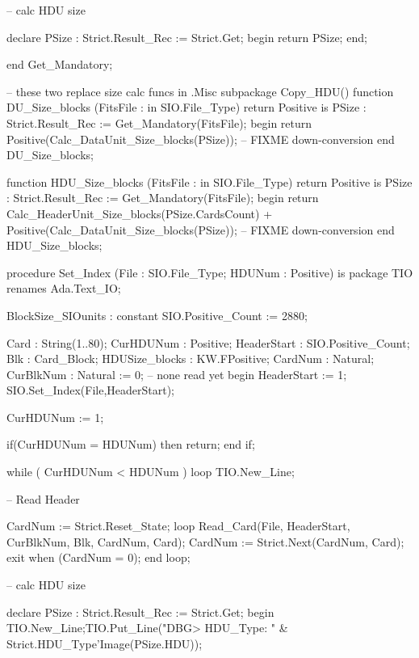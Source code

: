                 -- calc HDU size

                declare
                        PSize : Strict.Result_Rec := Strict.Get;
                begin
			return PSize;
                end;

   end Get_Mandatory;


	
-- these two replace size calc funcs in .Misc subpackage Copy_HDU()
   function  DU_Size_blocks (FitsFile : in SIO.File_Type) return Positive
   is 
	PSize : Strict.Result_Rec := Get_Mandatory(FitsFile);
   begin
        return Positive(Calc_DataUnit_Size_blocks(PSize)); -- FIXME down-conversion
   end DU_Size_blocks;

  function  HDU_Size_blocks (FitsFile : in SIO.File_Type) return Positive
   is 
	PSize : Strict.Result_Rec := Get_Mandatory(FitsFile);
   begin
        return Calc_HeaderUnit_Size_blocks(PSize.CardsCount)
               + Positive(Calc_DataUnit_Size_blocks(PSize)); -- FIXME down-conversion
   end HDU_Size_blocks;




procedure Set_Index
           (File   : SIO.File_Type;
            HDUNum : Positive)
is
        package TIO renames Ada.Text_IO;

        BlockSize_SIOunits : constant SIO.Positive_Count := 2880;
    
        Card : String(1..80);
        CurHDUNum : Positive;
        HeaderStart : SIO.Positive_Count;
        Blk : Card_Block;
        HDUSize_blocks : KW.FPositive;
        CardNum : Natural;
        CurBlkNum : Natural := 0; -- none read yet
begin
        HeaderStart := 1;
        SIO.Set_Index(File,HeaderStart);

        CurHDUNum := 1;

        if(CurHDUNum = HDUNum) then
                return;
        end if;

        while ( CurHDUNum < HDUNum )
        loop
                TIO.New_Line;

                -- Read Header
    
                CardNum := Strict.Reset_State;
                loop
                        Read_Card(File, HeaderStart, CurBlkNum, Blk, CardNum, Card);
                        CardNum := Strict.Next(CardNum, Card);
                        exit when (CardNum = 0); 
                end loop;

                -- calc HDU size

               declare
                        PSize : Strict.Result_Rec := Strict.Get;
                begin
 			TIO.New_Line;TIO.Put_Line("DBG> HDU_Type: " 
                                                & Strict.HDU_Type'Image(PSize.HDU));

